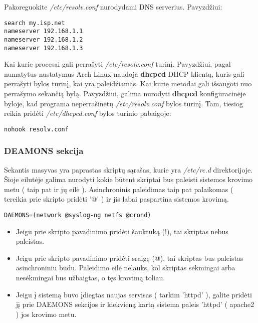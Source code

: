 Pakoreguokite \textsl{/etc/resolv.conf} nurodydami DNS
serverius. Pavyzdžiui:

\begin{verbatim}
search my.isp.net
nameserver 192.168.1.1
nameserver 192.168.1.2
nameserver 192.168.1.3
\end{verbatim}

Kai kurie procesai gali perrašyti \textsl{/etc/resolv.conf}
turinį. Pavyzdžiui, pagal numatytus nustatymus Arch Linux naudoja
\textbf{dhcpcd} DHCP klientą, kuris gali perrašyti bylos turinį, kai
yra paleidžiamas. Kai kurie metodai gali išsaugoti nuo perrašymo
sekančią bylą. Pavyzdžiui, galima nurodyti \textbf{dhcpcd}
konfigūracinėje byloje, kad programa neperrašinėtų
\textsl{/etc/resolv.conf} bylos turinį. Tam, tiesiog reikia pridėti
\textsl{/etc/dhcpcd.conf} bylos turinio pabaigoje:

\begin{verbatim}
nohook resolv.conf
\end{verbatim} 

\subsubsection{DEAMONS sekcija}

Sekantis masyvas yra paprastas skriptų sąrašas, kurie yra
\textsl{/etc/rc.d} direktorijoje. Šioje eilutėje galima nurodyti kokie
būtent skriptai bus paleisti sistemos krovimo metu ( taip pat ir jų
eilė ). Asinchroninis paleidimas taip pat palaikomas ( tereikia prie
skripto pridėti '@' ) ir jis labai paspartina sistemos krovimą.

\begin{verbatim}
DAEMONS=(network @syslog-ng netfs @crond)
\end{verbatim}

\begin{itemize}
  \item Jeigu prie skripto pavadinimo pridėti šauktuką (!), tai
    skriptas nebus paleistas.
  \item Jeigu prie skripto pavadinimo pridėti sraigę (@), tai skriptas
    bus paleistas asinchroniniu būdu. Paleidimo eilė nelauks, kol
    skriptas sėkmingai arba nesėkmingai bus užbaigtas, o tęs krovimą toliau.
  \item Jeigu į sistemą buvo įdiegtas naujas servisas ( tarkim 'httpd'
    ), galite pridėti jį prie DAEMONS sekcijos ir kiekvieną kartą
    sistema paleis 'httpd' ( apache2 ) jos krovimo metu. 
\end{itemize}

